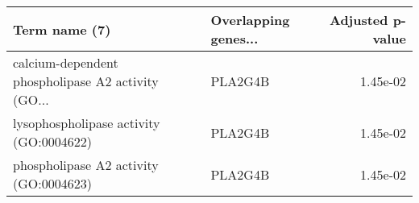 \begin{tabular}{llr}
\toprule
                                     Term name (7) & Overlapping genes... &  Adjusted p-value \\
\midrule
calcium-dependent phospholipase A2 activity (GO... &              PLA2G4B &          1.45e-02 \\
           lysophospholipase activity (GO:0004622) &              PLA2G4B &          1.45e-02 \\
            phospholipase A2 activity (GO:0004623) &              PLA2G4B &          1.45e-02 \\
\bottomrule
\end{tabular}
